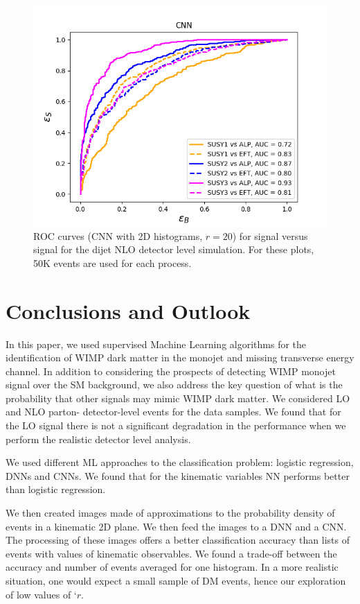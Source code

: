 \documentclass[prd,aps,letterpaper,floatfix,superscriptaddress,preprintnumbers,twocolumn,10pt,nofootinbib]{revtex4-1}
\begin{document}
\begin{figure}%
\centering
\includegraphics[scale=0.50]{figures/2D_CNN_SUSY_vs_sig_NLO_pt-metphij1_ROC.png}
\caption{ROC curves (CNN with 2D histograms, $r = 20$) for signal versus signal for the dijet NLO detector level simulation. For these plots, 50K events are used for each process.}\label{2D_CNN_SUSY_vs_sig_NLO_ROC}
\end{figure}
\section{Conclusions and Outlook}
In this paper, we used supervised Machine Learning algorithms for the identification of WIMP dark matter in the monojet and missing transverse energy channel. In addition to considering the prospects of detecting WIMP monojet signal over the SM background, we also address the key question of what is the probability that other  signals may mimic WIMP dark matter. We considered LO and NLO parton- detector-level  events for the data samples. We found that for the LO signal there is not a significant degradation in the performance when we perform the realistic detector level analysis.
 
We used different ML approaches to the classification problem: logistic regression, DNNs and CNNs.  We found that for the kinematic variables NN performs better than logistic regression. 

We then created images made of approximations to the probability density of events in a kinematic 2D plane. We then feed the images to a DNN and a CNN. The processing of these images  offers a better classification accuracy  than lists of events with values of kinematic observables.  We found a trade-off between the accuracy and number of events averaged for one histogram. In a more realistic situation, one would expect a small sample of DM events, hence our exploration of low values of  `$r$. 
\end{document}
